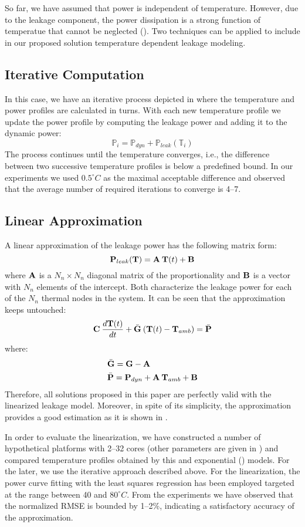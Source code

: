So far, we have assumed that power is independent of temperature. However, due to the leakage component, the power dissipation is a strong function of temperatue that cannot be neglected (). Two techniques can be applied to include in our proposed solution temperature dependent leakage modeling.

\subsection{Iterative Computation} \label{sec:iterative-leakage}
In this case, we have an iterative process depicted in  where the temperature and power profiles are calculated in turns. With each new temperature profile we update the power profile by computing the leakage power and adding it to the dynamic power:
\[
  \mathbb{P}_i = \mathbb{P}_{dyn} + \mathbb{P}_{leak}(\mathbb{T}_i)
\]
The process continues until the temperature converges, i.e., the difference between two successive temperature profiles is below a predefined bound. In our experiments we used $0.5^\circ C$ as the maximal acceptable difference and observed that the average number of required iterations to converge is 4--7.

\subsection{Linear Approximation} \label{sec:linearized-leakage}
A linear approximation of the leakage power has the following matrix form:
\[
  \mathbf{P}_{leak}(\mathbf{T}) = \mathbf{A} \: \mathbf{T}(t) + \mathbf{B}
\]
where $\mathbf{A}$ is a $N_n \times N_n$ diagonal matrix of the proportionality and $\mathbf{B}$ is a vector with $N_n$ elements of the intercept. Both characterize the leakage power for each of the $N_n$ thermal nodes in the system. It can be seen that the approximation keeps  untouched:
\[
  \mathbf{C} \: \frac{d\mathbf{T}(t)}{dt} + \bar{\mathbf{G}} \: (\mathbf{T}(t) - \mathbf{T}_{amb}) = \bar{\mathbf{P}}
\]
where:
\begin{align*}
  & \bar{\mathbf{G}} = \mathbf{G} - \mathbf{A} \\
  & \bar{\mathbf{P}} = \mathbf{P}_{dyn} + \mathbf{A} \: \mathbf{T}_{amb} + \mathbf{B}
\end{align*}
Therefore, all solutions proposed in this paper are perfectly valid with the linearized leakage model. Moreover, in spite of its simplicity, the approximation provides a good estimation as it is shown in \cite{liu2007}.

In order to evaluate the linearization, we have constructed a number of hypothetical platforms with 2--32 cores (other parameters are given in ) and compared temperature profiles obtained by this and exponential () models. For the later, we use the iterative approach described above. For the linearization, the power curve fitting with the least squares regression \cite{press2007} has been employed targeted at the range between 40 and $80^\circ C$. From the experiments we have observed that the normalized RMSE is bounded by 1--2\%, indicating a satisfactory accuracy of the approximation.
